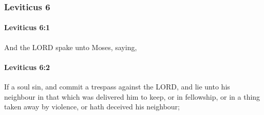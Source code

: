 	\subsubsection{Leviticus 6} %
		\label{LEVITICUS-6}

		\paragraph{Leviticus 6:1} %
			\label{LEVITICUS-6-1}

			And the LORD spake unto Moses, saying,


		\paragraph{Leviticus 6:2} %
			\label{LEVITICUS-6-2}

			If a soul sin, and commit a trespass against the LORD, and lie unto his neighbour in that which was delivered him to keep, or in fellowship, or in a thing taken away by violence, or hath deceived his neighbour;

